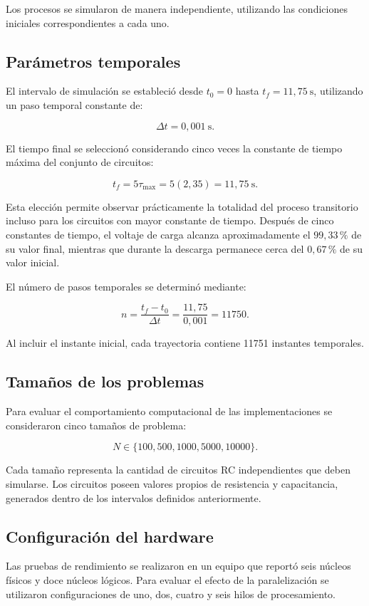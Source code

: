 \documentclass[11pt,a4paper]{article}
\begin{document}
Los procesos se simularon de manera independiente, utilizando
las condiciones iniciales correspondientes a cada uno.

\subsection{Parámetros temporales}

El intervalo de simulación se estableció desde $t_0=0$ hasta
$t_f=11,75\ \text{s}$, utilizando un paso temporal constante
de:

\[
\Delta t=0,001\ \text{s}.
\]

El tiempo final se seleccionó considerando cinco veces la
constante de tiempo máxima del conjunto de circuitos:

\[
t_f=5\tau_{\max}
=5(2,35)
=11,75\ \text{s}.
\]

Esta elección permite observar prácticamente la totalidad
del proceso transitorio incluso para los circuitos con
mayor constante de tiempo. Después de cinco constantes de
tiempo, el voltaje de carga alcanza aproximadamente el
$99,33\,\%$ de su valor final, mientras que durante la
descarga permanece cerca del $0,67\,\%$ de su valor inicial.

El número de pasos temporales se determinó mediante:

\[
n=\frac{t_f-t_0}{\Delta t}
=\frac{11,75}{0,001}
=11750.
\]

Al incluir el instante inicial, cada trayectoria contiene
11751 instantes temporales.

\subsection{Tamaños de los problemas}

Para evaluar el comportamiento computacional de las
implementaciones se consideraron cinco tamaños de problema:

\[
N\in\{100,500,1000,5000,10000\}.
\]

Cada tamaño representa la cantidad de circuitos RC
independientes que deben simularse. Los circuitos poseen
valores propios de resistencia y capacitancia, generados
dentro de los intervalos definidos anteriormente.

\subsection{Configuración del hardware}

Las pruebas de rendimiento se realizaron en un equipo que
reportó seis núcleos físicos y doce núcleos lógicos. Para
evaluar el efecto de la paralelización se utilizaron
configuraciones de uno, dos, cuatro y seis hilos de
procesamiento.
\end{document}
